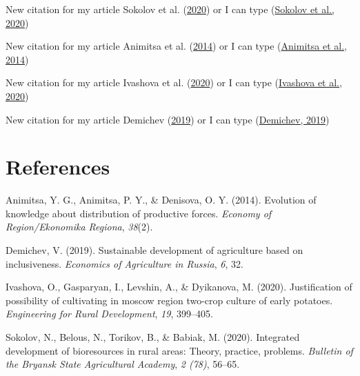 \documentclass[
  12pt,
]{article}
\newlength{\cslhangindent}
\newlength{\cslentryspacingunit} %
\newenvironment{CSLReferences}[2] %
 {%
  \setlength{\parindent}{0pt}
  \ifodd #1
  \let\oldpar\par
  \def\par{\hangindent=\cslhangindent\oldpar}
  \fi
  \setlength{\parskip}{#2\cslentryspacingunit}
 }%
 {}
\begin{document}
New citation for my article Sokolov et al. (\protect\hyperlink{ref-sokolov2020complex}{2020}) or I can type (\protect\hyperlink{ref-sokolov2020complex}{Sokolov et al., 2020})

New citation for my article Animitsa et al. (\protect\hyperlink{ref-animitsa2014evolution}{2014}) or I can type (\protect\hyperlink{ref-animitsa2014evolution}{Animitsa et al., 2014})

New citation for my article Ivashova et al. (\protect\hyperlink{ref-ivashova2020justification}{2020}) or I can type (\protect\hyperlink{ref-ivashova2020justification}{Ivashova et al., 2020})

New citation for my article Demichev (\protect\hyperlink{ref-demichev2019sustainable}{2019}) or I can type (\protect\hyperlink{ref-demichev2019sustainable}{Demichev, 2019})

\newpage

\hypertarget{references}{%
\section{References}\label{references}}

\hypertarget{refs}{}
\begin{CSLReferences}{1}{0}
\leavevmode{}%
Animitsa, Y. G., Animitsa, P. Y., \& Denisova, O. Y. (2014). Evolution of knowledge about distribution of productive forces. \emph{Economy of Region/Ekonomika Regiona}, \emph{38}(2).

\leavevmode{}%
Demichev, V. (2019). Sustainable development of agriculture based on inclusiveness. \emph{Economics of Agriculture in Russia}, \emph{6}, 32.

\leavevmode{}%
Ivashova, O., Gasparyan, I., Levshin, A., \& Dyikanova, M. (2020). Justification of possibility of cultivating in moscow region two-crop culture of early potatoes. \emph{Engineering for Rural Development}, \emph{19}, 399--405.

\leavevmode{}%
Sokolov, N., Belous, N., Torikov, B., \& Babiak, M. (2020). Integrated development of bioresources in rural areas: Theory, practice, problems. \emph{Bulletin of the Bryansk State Agricultural Academy}, \emph{2 (78)}, 56--65.

\end{CSLReferences}
\end{document}
